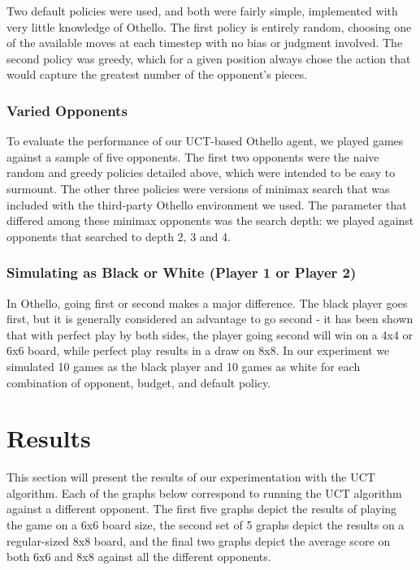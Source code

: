 \documentclass[12pt,letterpaper]{article}
\begin{document}
Two default policies were used, and both were fairly simple, implemented with very little knowledge of Othello. The first policy is entirely random, choosing one of the available moves at each timestep with no bias or judgment involved. The second policy was greedy, which for a given position always chose the action that would capture the greatest number of the opponent's pieces.

\subsubsection{Varied Opponents}
To evaluate the performance of our UCT-based Othello agent, we played games against a sample of five opponents. The first two opponents were the naive random and greedy policies detailed above, which were intended to be easy to surmount. The other three policies were versions of minimax search that was included with the third-party Othello environment we used. The parameter that differed among these minimax opponents was the search depth: we played against opponents that searched to depth 2, 3 and 4.

\subsubsection{Simulating as Black or White (Player 1 or Player 2)}
In Othello, going first or second makes a major difference. The black player goes first, but it is generally considered an advantage to go second - it has been shown that with perfect play by both sides, the player going second will win on a 4x4 or 6x6 board, while perfect play results in a draw on 8x8. In our experiment we simulated 10 games as the black player and 10 games as white for each combination of opponent, budget, and default policy.

\section{Results}
\label{results}

This section will present the results of our experimentation with the UCT algorithm. Each of the graphs below correspond to running the UCT algorithm against a different opponent.  The first five graphs depict the results of playing the game on a 6x6 board size, the second set of 5 graphs depict the results on a regular-sized 8x8 board, and the final two graphs depict the average score on both 6x6 and 8x8 against all the different opponents.
\end{document}

